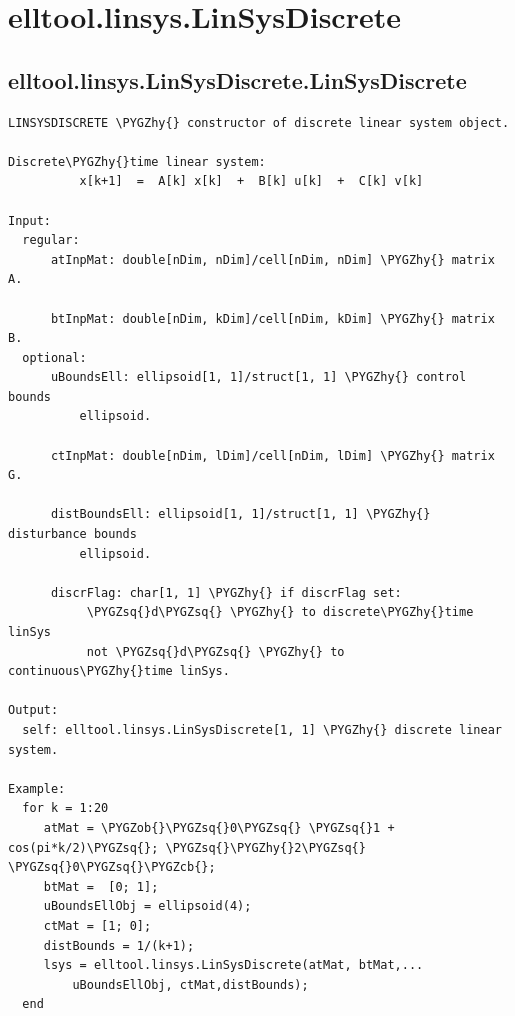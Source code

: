 \documentclass[letterpaper,10pt,english]{sphinxmanual}
\def\PYGZob{\char`\{}
\def\PYGZcb{\char`\}}
\def\PYGZhy{\char`\-}
\def\PYGZsq{\char`\'}
\begin{document}
\section{elltool.linsys.LinSysDiscrete}
\label{chap_functions:elltool-linsys-linsysdiscrete}

\subsection{elltool.linsys.LinSysDiscrete.LinSysDiscrete}
\label{chap_functions:elltool-linsys-linsysdiscrete-linsysdiscrete}
\begin{Verbatim}[commandchars=\\\{\}]
LINSYSDISCRETE \PYGZhy{} constructor of discrete linear system object.

Discrete\PYGZhy{}time linear system:
          x[k+1]  =  A[k] x[k]  +  B[k] u[k]  +  C[k] v[k]

Input:
  regular:
      atInpMat: double[nDim, nDim]/cell[nDim, nDim] \PYGZhy{} matrix A.

      btInpMat: double[nDim, kDim]/cell[nDim, kDim] \PYGZhy{} matrix B.
  optional:
      uBoundsEll: ellipsoid[1, 1]/struct[1, 1] \PYGZhy{} control bounds
          ellipsoid.

      ctInpMat: double[nDim, lDim]/cell[nDim, lDim] \PYGZhy{} matrix G.

      distBoundsEll: ellipsoid[1, 1]/struct[1, 1] \PYGZhy{} disturbance bounds
          ellipsoid.

      discrFlag: char[1, 1] \PYGZhy{} if discrFlag set:
           \PYGZsq{}d\PYGZsq{} \PYGZhy{} to discrete\PYGZhy{}time linSys
           not \PYGZsq{}d\PYGZsq{} \PYGZhy{} to continuous\PYGZhy{}time linSys.

Output:
  self: elltool.linsys.LinSysDiscrete[1, 1] \PYGZhy{} discrete linear system.

Example:
  for k = 1:20
     atMat = \PYGZob{}\PYGZsq{}0\PYGZsq{} \PYGZsq{}1 + cos(pi*k/2)\PYGZsq{}; \PYGZsq{}\PYGZhy{}2\PYGZsq{} \PYGZsq{}0\PYGZsq{}\PYGZcb{};
     btMat =  [0; 1];
     uBoundsEllObj = ellipsoid(4);
     ctMat = [1; 0];
     distBounds = 1/(k+1);
     lsys = elltool.linsys.LinSysDiscrete(atMat, btMat,...
         uBoundsEllObj, ctMat,distBounds);
  end
\end{Verbatim}
\end{document}

